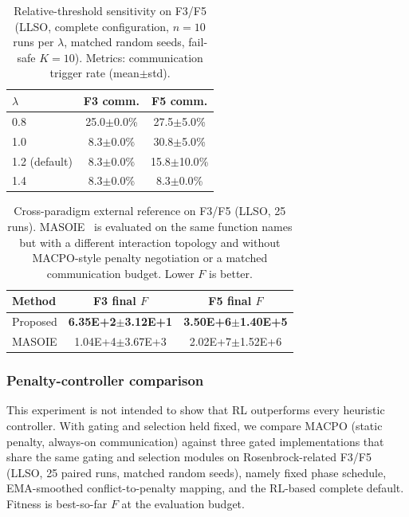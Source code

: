 \documentclass[conference]{IEEEtran}
\begin{document}
\begin{table}[!t]
\centering
\scriptsize
\caption{Relative-threshold sensitivity on F3/F5 (LLSO, complete configuration, $n{=}10$ runs per $\lambda$, matched random seeds, fail-safe $K{=}10$). Metrics: communication trigger rate (mean$\pm$std).}
\label{tab:lambda_sensitivity}
\setlength{\tabcolsep}{3pt}
\begin{tabular}{@{}lcc@{}}
\toprule
$\lambda$ & F3 comm. & F5 comm. \\
\midrule
0.8 & 25.0{$\pm$0.0}\% & 27.5{$\pm$5.0}\% \\
1.0 & 8.3{$\pm$0.0}\% & 30.8{$\pm$5.0}\% \\
1.2 (default) & 8.3{$\pm$0.0}\% & 15.8{$\pm$10.0}\% \\
1.4 & 8.3{$\pm$0.0}\% & 8.3{$\pm$0.0}\% \\
\bottomrule
\end{tabular}
\end{table}

\begin{table}[!t]
\centering
\scriptsize
\caption{Cross-paradigm external reference on F3/F5 (LLSO, 25 runs). MASOIE~\cite{ref_masoie_2024} is evaluated on the same function names but with a different interaction topology and without MACPO-style penalty negotiation or a matched communication budget. Lower $F$ is better.}
\label{tab:external_masoie}
\setlength{\tabcolsep}{3pt}
\begin{tabular}{@{}lcc@{}}
\toprule
Method & F3 final $F$ & F5 final $F$ \\
\midrule
Proposed & \textbf{6.35E+2{$\pm$3.12E+1}} & \textbf{3.50E+6{$\pm$1.40E+5}} \\
MASOIE \cite{ref_masoie_2024} & 1.04E+4{$\pm$3.67E+3} & 2.02E+7{$\pm$1.52E+6} \\
\bottomrule
\end{tabular}
\end{table}

\subsubsection{Penalty-controller comparison}\label{sec:q3_penalty}
This experiment is not intended to show that RL outperforms every heuristic controller. With gating and selection held fixed, we compare MACPO (static penalty, always-on communication) against three gated implementations that share the same gating and selection modules on Rosenbrock-related F3/F5 (LLSO, 25 paired runs, matched random seeds), namely fixed phase schedule, EMA-smoothed conflict-to-penalty mapping, and the RL-based complete default. Fitness is best-so-far $F$ at the evaluation budget.
\end{document}
